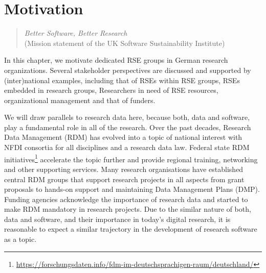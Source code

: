 \documentclass[a4paper]{article}
\begin{document}
\section{Motivation}


\begin{quotation}
      \textit{Better Software, Better Research}\\(Mission statement of the UK Software Sustainability Institute)
\end{quotation}

In this chapter, we motivate dedicated RSE groups in German research organizations.
Several stakeholder perspectives are discussed and supported by (inter)national examples, including that of RSEs within RSE groups, RSEs embedded in research groups, Researchers in need of RSE resources, organizational management and that of funders.

We will draw parallels to research data here, because both, data and software, play a fundamental role in all of the research.
Over the past decades, Research Data Management (RDM) has evolved into a topic of national interest with NFDI consortia for all disciplines and a research data law.
Federal state RDM initiatives\footnote{\url{https://forschungsdaten.info/fdm-im-deutschsprachigen-raum/deutschland/}} accelerate the topic further and provide regional training, networking and other supporting services.
Many research organisations have established central RDM groups that support research projects in all aspects from grant proposals to hands-on support and maintaining Data Management Plans (DMP).
Funding agencies acknowledge the importance of research data and started to make RDM mandatory in research projects.
Due to the similar nature of both, data and software, and their importance in today's digital research, it is reasonable to expect a similar trajectory in the development of research software as a topic.
\end{document}

